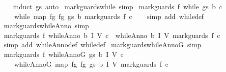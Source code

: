 \begin{isabellebody}
%
\isadelimproof
\ \ %
\endisadelimproof
%
\isatagproof
{}\isamarkupfalse%
\ {\isacharparenleft}induct\ gs{\isacharparenright}\ auto%
\endisatagproof
{\isafoldproof}%
%
\isadelimproof
\isanewline
%
\endisadelimproof
\isanewline
{}\isamarkupfalse%
\ mark{\isacharunderscore}guards{\isacharunderscore}while\ {\isacharbrackleft}simp{\isacharbrackright}{\isacharcolon}\isanewline
\ {\isachardoublequoteopen}mark{\isacharunderscore}guards\ f\ {\isacharparenleft}while\ gs\ b\ c{\isacharparenright}\ {\isacharequal}\ \isanewline
\ \ \ \ while\ {\isacharparenleft}map\ {\isacharparenleft}{\isasymlambda}{\isacharparenleft}f{\isacharprime}{\isacharcomma}g{\isacharparenright}{\isachardot}\ {\isacharparenleft}f{\isacharcomma}g{\isacharparenright}{\isacharparenright}\ gs{\isacharparenright}\ b\ {\isacharparenleft}mark{\isacharunderscore}guards\ f\ c{\isacharparenright}{\isachardoublequoteclose}\isanewline
%
\isadelimproof
\ \ %
\endisadelimproof
%
\isatagproof
{}\isamarkupfalse%
\ {\isacharparenleft}simp\ add{\isacharcolon}\ while{\isacharunderscore}def{\isacharparenright}%
\endisatagproof
{\isafoldproof}%
%
\isadelimproof
\ \isanewline
%
\endisadelimproof
\isanewline
{}\isamarkupfalse%
\ mark{\isacharunderscore}guards{\isacharunderscore}whileAnno\ {\isacharbrackleft}simp{\isacharbrackright}{\isacharcolon}\isanewline
\ {\isachardoublequoteopen}mark{\isacharunderscore}guards\ f\ {\isacharparenleft}whileAnno\ b\ I\ V\ c{\isacharparenright}\ {\isacharequal}\ whileAnno\ b\ I\ V\ {\isacharparenleft}mark{\isacharunderscore}guards\ f\ c{\isacharparenright}{\isachardoublequoteclose}\isanewline
%
\isadelimproof
\ \ %
\endisadelimproof
%
\isatagproof
{}\isamarkupfalse%
\ {\isacharparenleft}simp\ add{\isacharcolon}\ whileAnno{\isacharunderscore}def\ while{\isacharunderscore}def{\isacharparenright}%
\endisatagproof
{\isafoldproof}%
%
\isadelimproof
\isanewline
%
\endisadelimproof
\isanewline
{}\isamarkupfalse%
\ mark{\isacharunderscore}guards{\isacharunderscore}whileAnnoG\ {\isacharbrackleft}simp{\isacharbrackright}{\isacharcolon}\isanewline
\ {\isachardoublequoteopen}mark{\isacharunderscore}guards\ f\ {\isacharparenleft}whileAnnoG\ gs\ b\ I\ V\ c{\isacharparenright}\ {\isacharequal}\ \isanewline
\ \ \ \ whileAnnoG\ {\isacharparenleft}map\ {\isacharparenleft}{\isasymlambda}{\isacharparenleft}f{\isacharprime}{\isacharcomma}g{\isacharparenright}{\isachardot}\ {\isacharparenleft}f{\isacharcomma}g{\isacharparenright}{\isacharparenright}\ gs{\isacharparenright}\ b\ I\ V\ {\isacharparenleft}mark{\isacharunderscore}guards\ f\ c{\isacharparenright}{\isachardoublequoteclose}\isanewline

\end{isabellebody}
